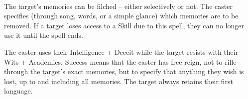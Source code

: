 \begin{multicols}{2}
\\
The target's memories can be filched -- either selectively or not. The caster specifies (through song, words, or a simple glance) which memories are to be removed. If a target loses access to a Skill due to this spell, they can no longer use it until the spell ends.

The caster uses their Intelligence + Deceit while the target resists with their Wits + Academics.
Success means that the caster has free reign, not to rifle through the target's exact memories, but to specify that anything they wish is lost, up to and including all memories.
The target always retains their first language.

\end{multicols}


